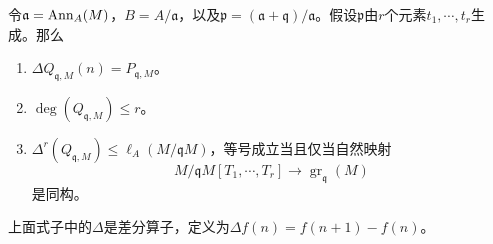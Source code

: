 \begin{proposition}
令$\mathfrak{a} = \operatorname{Ann}_A(M)$，$B = A / \mathfrak{a}$，以及$\mathfrak{p} = (\mathfrak{a} + \mathfrak{q}) / \mathfrak{a}$。假设$\mathfrak{p}$由$r$个元素$t_1,\cdots,t_r$生成。那么
\begin{enumerate}
\item $\Delta Q_{\mathfrak{q},M}(n) = P_{\mathfrak{q},M}$。
\item $\deg(Q_{\mathfrak{q},M}) \leqslant r$。
\item $\Delta^r(Q_{\mathfrak{q},M}) \leqslant \ell_A(M / \mathfrak{q}M)$，等号成立当且仅当自然映射
$$M / \mathfrak{q}M[T_1,\cdots,T_r] \longrightarrow \operatorname{gr}_{\mathfrak{q}}(M)$$
是同构。
\end{enumerate}
上面式子中的$\Delta$是差分算子，定义为$\Delta f(n) = f(n+1) - f(n)$。
\end{proposition}

